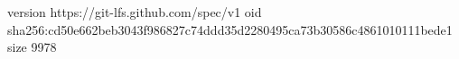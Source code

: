 version https://git-lfs.github.com/spec/v1
oid sha256:cd50e662beb3043f986827c74ddd35d2280495ca73b30586c4861010111bede1
size 9978

